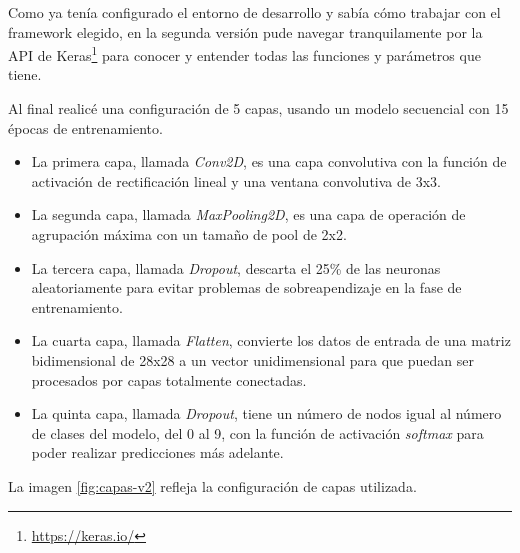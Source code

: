 Como ya tenía configurado el entorno de desarrollo y sabía cómo trabajar con el framework elegido, en la segunda versión pude navegar tranquilamente por la API de Keras\footnote{\url{https://keras.io/}} para conocer y entender todas las funciones y parámetros que tiene.

\bigskip

Al final realicé una configuración de 5 capas, usando un modelo secuencial con 15 épocas de entrenamiento.

\bigskip

\begin{itemize}
  \item La primera capa, llamada  \textit{Conv2D}, es una capa convolutiva con la función de activación de rectificación lineal y una ventana convolutiva de 3x3.
  \item La segunda capa, llamada \textit{MaxPooling2D}, es una capa de operación de agrupación máxima con un tamaño de pool de 2x2.
  \item La tercera capa, llamada \textit{Dropout}, descarta el 25\% de las neuronas aleatoriamente para evitar problemas de sobreapendizaje en la fase de entrenamiento.
  \item La cuarta capa, llamada \textit{Flatten}, convierte los datos de entrada de una matriz bidimensional de 28x28 a un vector unidimensional para que puedan ser procesados por capas totalmente conectadas.
  \item La quinta capa, llamada \textit{Dropout}, tiene un número de nodos igual al número de clases del modelo, del 0 al 9, con la función de activación \textit{softmax} para poder realizar predicciones más adelante.
\end{itemize}

\bigskip

La imagen \ref{fig:capas-v2} refleja la configuración de capas utilizada.

\bigskip

